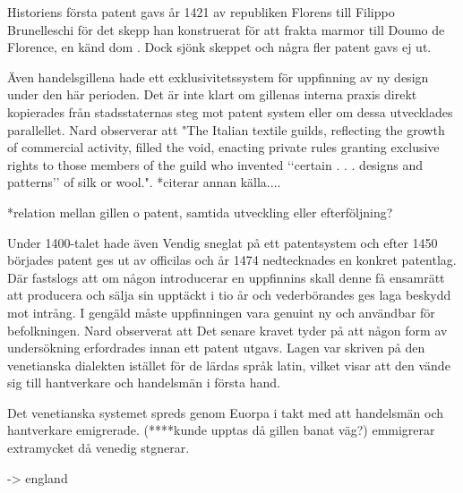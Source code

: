 Historiens första patent gavs år 1421 av republiken Florens till Filippo Brunelleschi för det skepp han konstruerat för att frakta marmor till Doumo de Florence, en känd dom \cite{frumkin}. 
Dock sjönk skeppet och några fler patent gavs ej ut. 

Även handelsgillena hade ett exklusivitetssystem för uppfinning av ny design under den här perioden. Det är inte klart om gillenas interna praxis direkt kopierades från stadsstaternas steg mot patent system eller om dessa utvecklades parallellet. Nard observerar att "The Italian textile guilds, reflecting the growth of commercial activity, filled the void, enacting private rules granting exclusive rights to those members of the guild who invented ‘‘certain . . . designs and patterns’’ of silk or wool."\cite{nard}. *citerar annan källa....

*relation mellan gillen o patent, samtida utveckling eller efterföljning?

Under 1400-talet hade även Vendig sneglat på ett patentsystem och efter 1450 börjades patent ges ut av officilas och år 1474 nedtecknades en konkret patentlag\cite{frumkin}. 
Där fastslogs att om någon introducerar en uppfinnins skall denne få ensamrätt att producera och sälja sin upptäckt i tio år och vederbörandes ges laga beskydd mot intrång. 
I gengäld måste uppfinningen vara genuint ny och användbar för befolkningen. 
Nard observerat att Det senare kravet tyder på att någon form av undersökning erfordrades innan ett patent utgavs\cite{nard}. 
Lagen var skriven på den venetianska dialekten istället för de lärdas språk latin, vilket visar att den vände sig till hantverkare och handelsmän i första hand.

Det venetianska systemet spreds genom Euorpa i takt med att handelsmän och hantverkare emigrerade. 
(****kunde upptas då gillen banat väg?) emmigrerar extramycket då venedig stgnerar\cite{nard}.

-> england




